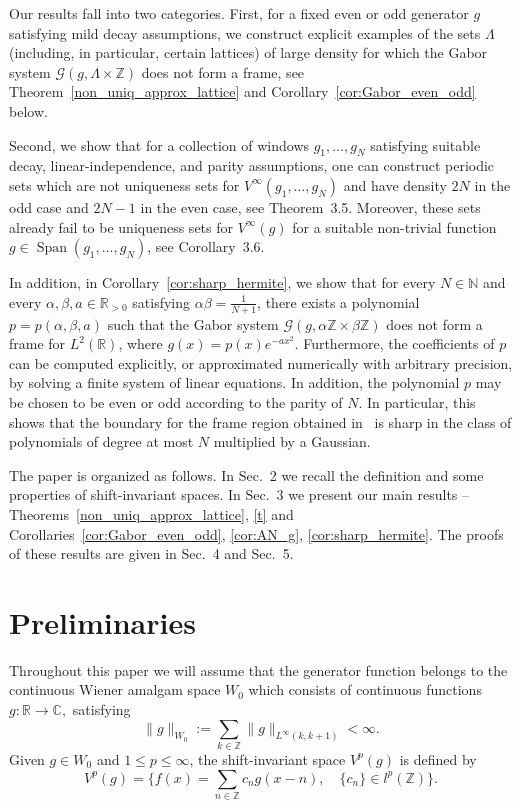 \documentclass[12pt]{amsart}
\numberwithin{equation}{section}
\newcommand{\R}{{\mathbb R}} \newcommand{\Q}{{\mathbb Q}} \newcommand{\Z}{{\mathbb Z}} \newcommand{\N}{{\mathbb N}}
\newcommand{\Cc}{{\mathbb C}}\newcommand{\vv}{{\bf v}} \newcommand{\zz}{{\bf z}} \newcommand{\xx}{{\bf x}} \newcommand{\yy}{{\bf y}}\newcommand{\uu}{{\bf u}}
\begin{document}
Our results fall into two categories.
First, for a fixed even or odd generator $g$ satisfying mild decay assumptions, we construct explicit examples of the sets $\Lambda$ (including, in particular, certain lattices) of large density for which the Gabor system $\mathcal{G}(g, \Lambda \times \Z)$ does not form a frame, see Theorem~\ref{non_uniq_approx_lattice} and Corollary~\ref{cor:Gabor_even_odd} below. 


Second, we show that for a collection of windows $g_1,\ldots,g_N$ satisfying suitable decay, linear-independence, and parity assumptions, one can construct periodic sets which are not uniqueness sets for $V^\infty(g_1,\ldots,g_N)$ and have density $2N$ in the odd case and $2N-1$ in the even case, see Theorem~3.5. Moreover, these sets already fail to be uniqueness sets for $V^\infty(g)$ for a suitable non-trivial function $g\in \operatorname{Span}(g_1,\ldots,g_N)$, see Corollary~3.6.

In addition, in Corollary~\ref{cor:sharp_hermite}, we show that for every $N\in\N$ and every $\alpha,\beta,a\in\R_{>0}$ satisfying $\alpha\beta=\frac{1}{N+1}$, there exists a polynomial $p=p(\alpha,\beta,a)$ such that the Gabor system
$\mathcal{G}(g,\alpha\Z\times\beta\Z)$
does not form a frame for $L^2(\R)$, where
$g(x)=p(x)e^{-a x^2}.$
Furthermore, the coefficients of $p$ can be computed explicitly, or approximated numerically with arbitrary precision, by solving a finite system of linear equations. In addition, the polynomial $p$ may be chosen to be even or odd according to the parity of $N$.
In particular, this shows that the boundary for the frame region obtained in~\cite{MR2529475} is sharp in the class of polynomials of degree at most $N$ multiplied by a Gaussian.



The paper is organized as follows. In Sec.~2 we recall the definition and some properties of shift-invariant spaces. In Sec.~3 we present our main results -- Theorems~\ref{non_uniq_approx_lattice}, \ref{t} and Corollaries~\ref{cor:Gabor_even_odd}, \ref{cor:AN_g}, \ref{cor:sharp_hermite}.
The proofs of these results are given in Sec.~4 and Sec.~5. 

\section{Preliminaries}
Throughout this paper we will assume that the generator function belongs to the continuous Wiener amalgam space $W_0$ which consists of continuous functions $g: \R \to \Cc,$ satisfying
\begin{equation}\label{wiener}\|g\|_{W_0} := \sum\limits_{k \in \Z} \|g\|_{L^\infty (k,k+1)} < \infty.\end{equation}
Given $g \in W_0$ and $1\leq p\leq \infty$, the shift-invariant space $V^p(g)$ is defined by 
$$
V^p(g)=\{f(x)=\sum\limits_{n\in\Z} c_n g(x-n), \quad \{c_n\} \in l^p(\Z)\}.
$$
\end{document}
